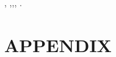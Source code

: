 \documentclass[a4paper]{article}
\begin{document}
\cite{Antonio04_NewPRM},
\cite{Kavraki02_Random_ConfigurationSpace_PP},\cite{Cai87_SpatialMotion_PointContact},\cite{Holland75_GAMethod},
\cite{Alouges10_MotionPlanning_RollingBody}.

\cleardoublepage
\normalem
\printbibliography 

%
%


\cleardoublepage
\appendix
\section{APPENDIX}
\label{appendix:A}
%
%
\end{document}

